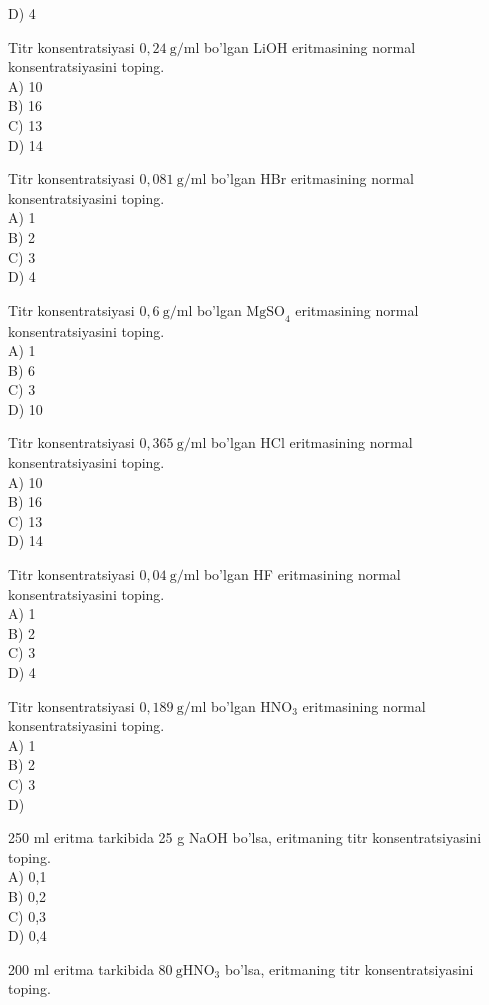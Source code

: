 D) 4
  \item Titr konsentratsiyasi $0,24 \mathrm{~g} / \mathrm{ml}$ bo'lgan LiOH eritmasining normal konsentratsiyasini toping.\\
A) 10\\
B) 16\\
C) 13\\
D) 14
  \item Titr konsentratsiyasi $0,081 \mathrm{~g} / \mathrm{ml}$ bo'lgan HBr eritmasining normal konsentratsiyasini toping.\\
A) 1\\
B) 2\\
C) 3\\
D) 4
  \item Titr konsentratsiyasi $0,6 \mathrm{~g} / \mathrm{ml}$ bo'lgan $\mathrm{MgSO}_{4}$ eritmasining normal konsentratsiyasini toping.\\
A) 1\\
B) 6\\
C) 3\\
D) 10
  \item Titr konsentratsiyasi $0,365 \mathrm{~g} / \mathrm{ml}$ bo'lgan HCl eritmasining normal konsentratsiyasini toping.\\
A) 10\\
B) 16\\
C) 13\\
D) 14
  \item Titr konsentratsiyasi $0,04 \mathrm{~g} / \mathrm{ml}$ bo'lgan HF eritmasining normal konsentratsiyasini toping.\\
A) 1\\
B) 2\\
C) 3\\
D) 4
  \item Titr konsentratsiyasi $0,189 \mathrm{~g} / \mathrm{ml}$ bo'lgan $\mathrm{HNO}_{3}$ eritmasining normal konsentratsiyasini toping.\\
A) 1\\
B) 2\\
C) 3\\
D) 
  \item 250 ml eritma tarkibida 25 g NaOH bo'lsa, eritmaning titr konsentratsiyasini toping.\\
A) 0,1\\
B) 0,2\\
C) 0,3\\
D) 0,4\\
  \item 200 ml eritma tarkibida $80 \mathrm{~g} \mathrm{HNO}_{3}$ bo'lsa, eritmaning titr konsentratsiyasini toping.\\
